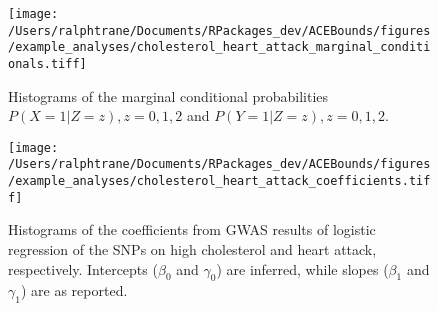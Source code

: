\documentclass[AMA,STIX1COL,]{WileyNJD-v2}
\begin{document}
\begin{figure}[ht]
  \center
  \texttt{[image: /Users/ralphtrane/Documents/RPackages\_dev/ACEBounds/figures/example\_analyses/cholesterol\_heart\_attack\_marginal\_conditionals.tiff]}
  \caption{Histograms of the marginal conditional probabilities $P(X = 1 | Z = z), z = 0,1,2$ and $P(Y = 1 | Z = z), z=0,1,2$.}
  \label{fig:smoking_on_depression_marginals}
\end{figure}

\begin{figure}[ht]
  \center
  \texttt{[image: /Users/ralphtrane/Documents/RPackages\_dev/ACEBounds/figures/example\_analyses/cholesterol\_heart\_attack\_coefficients.tiff]}
  \caption{Histograms of the coefficients from GWAS results of logistic regression of the SNPs on high cholesterol and heart attack, respectively. Intercepts ($\beta_0$ and $\gamma_0$) are inferred, while slopes ($\beta_1$ and $\gamma_1$) are as reported.}
  \label{fig:marginal-distribution-of-coefficients-depression}
\end{figure}
\end{document}
